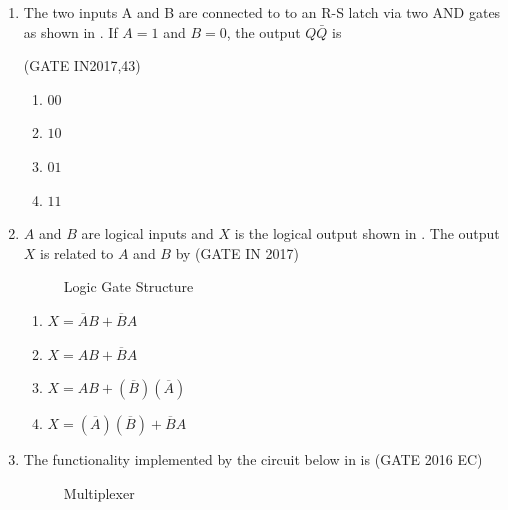 \begin{enumerate}[label=\arabic*.,ref=\theenumi]
\item The two inputs A and B are connected to to an R-S latch via two AND gates as shown in  
       .
If $A=1$ and $B=0$, the output $Q\bar{Q}$ is
    \begin{figure}[H]
        \centering
	\resizebox{0.75\columnwidth}{!}{%
        
	    }
	    \caption{}
       \label{fig:GATE IN2017,43}
       \end{figure}
       \hfill(GATE IN2017,43)
    \begin{enumerate}
   		\item $00$ 
   		\item $10$ 
   		\item $01$ 
   		\item $11$ 
   
   \end{enumerate}
\item $A$ and $B$ are logical inputs and $X$ is the logical output shown in 
.
	The output $X$ is related to $A$ and $B$ by \hfill{(GATE IN 2017)}
\begin{figure}[H]
\centering
\resizebox{0.75\columnwidth}{!}{%

	}
\caption{Logic Gate Structure}
\label{fig:gate_in_2017_30}
\end{figure}
\begin{enumerate}[label=\Alph*.]
\item $X = \overline{A}B + \overline{B}A$
\item $X = AB + \overline{B}A$
\item $X = AB + (\overline{B})(\overline{A})$
\item $X = (\overline{A})(\overline{B}) + \overline{B}A$
\end{enumerate}


\item The functionality implemented by the circuit below 
in
	is \hfill{(GATE 2016 EC)}

\begin{figure}[H]
\centering
\resizebox{0.75\columnwidth}{!}{%

	}
\caption{Multiplexer}
\label{fig:gate_ec_2016_43}
\end{figure}


\end{enumerate}
